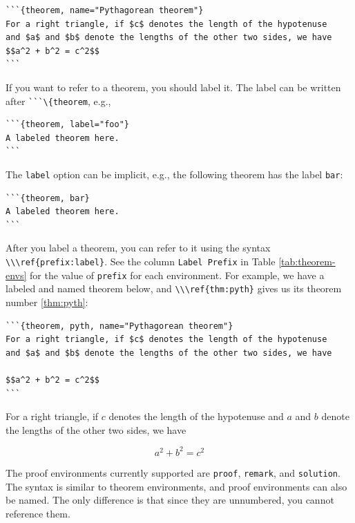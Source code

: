 \documentclass[doctor,openright,twoside]{sjtuthesis}
\newcommand{\passthrough}[1]{#1}
\theoremstyle{plain}
\theoremstyle{definition}
\theoremstyle{remark}
\theoremstyle{ocrenumbox}
\theoremstyle{plain}
\let\BeginKnitrBlock\begin \let\EndKnitrBlock\end
\begin{document}
\begin{lstlisting}
```{theorem, name="Pythagorean theorem"}
For a right triangle, if $c$ denotes the length of the hypotenuse
and $a$ and $b$ denote the lengths of the other two sides, we have
$$a^2 + b^2 = c^2$$
```
\end{lstlisting}

If you want to refer to a theorem, you should label it. The label can be
written after \passthrough{\lstinline!```\{theorem!}, e.g.,

\begin{lstlisting}
```{theorem, label="foo"}
A labeled theorem here.
```
\end{lstlisting}

The \passthrough{\lstinline!label!} option can be implicit, e.g., the
following theorem has the label \passthrough{\lstinline!bar!}:

\begin{lstlisting}
```{theorem, bar}
A labeled theorem here.
```
\end{lstlisting}

After you label a theorem, you can refer to it using the syntax
\passthrough{\lstinline!\\\ref{prefix:label}!}.
See the column \passthrough{\lstinline!Label Prefix!} in Table
\ref{tab:theorem-envs} for the value of \passthrough{\lstinline!prefix!}
for each environment. For example, we have a labeled and named theorem
below, and \passthrough{\lstinline!\\\ref{thm:pyth}!} gives us its
theorem number \ref{thm:pyth}:

\begin{lstlisting}
```{theorem, pyth, name="Pythagorean theorem"}
For a right triangle, if $c$ denotes the length of the hypotenuse
and $a$ and $b$ denote the lengths of the other two sides, we have

$$a^2 + b^2 = c^2$$
```
\end{lstlisting}

\BeginKnitrBlock{theorem}[Pythagorean theorem]
\protect\hypertarget{thm:pyth}{}{\label{thm:pyth} {} }For a right triangle, if \(c\) denotes the length of the
hypotenuse and \(a\) and \(b\) denote the lengths of the other two
sides, we have

\[a^2 + b^2 = c^2\]
\EndKnitrBlock{theorem}

The proof environments currently supported are
\passthrough{\lstinline!proof!}, \passthrough{\lstinline!remark!}, and
\passthrough{\lstinline!solution!}. The syntax is similar to theorem
environments, and proof environments can also be named. The only
difference is that since they are unnumbered, you cannot reference them.
\end{document}
